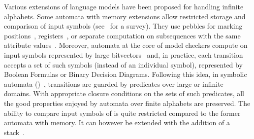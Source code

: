 %
%
Various extensions of language models have been proposed for handling infinite alphabets.
Some automata 
with memory extensions
allow restricted storage and comparison of input symbols
(see~\cite{Segoufin06csl} for a survey).
They use pebbles for marking positions~\cite{NevenSchwentickVianu04FSMinfinite},
registers~\cite{KaminskiFrancez94},
or %
separate computation on subsequences
with the same attribute values~\cite{Bojanczyk11FO2}. %
%
%
Moreover, automata at the core of model checkers
compute on input symbols represented by large bitvectors~\cite{Vardi07ciaa} %
and, in practice,  %
each transition accepts a set of such symbols (instead of an individual symbol),
represented by Boolean Formulas or Binary Decision Diagrams.
%
Following this idea, %
in symbolic automata (\SA)~\cite{Veanes12symbolic,dAntoniVeanes17CAV,dAntoni21CACM},
transitions are guarded by predicates over large or infinite domains.
With appropriate closure conditions on the sets of such predicates, %
all the good properties enjoyed by automata over finite alphabets are preserved.
The ability to compare input symbols of \SA is quite restricted compared to the 
former automata with memory. 
It can however be extended with the addition of a stack~\cite{dAntonyAlur14SVPDA}.

